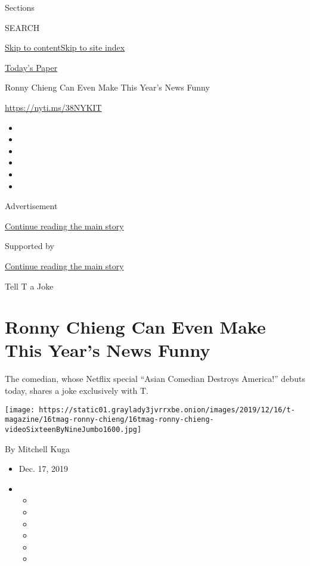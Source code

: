 Sections

SEARCH

\protect\hyperlink{site-content}{Skip to
content}\protect\hyperlink{site-index}{Skip to site index}

\href{https://myaccount.nytimes3xbfgragh.onion/auth/login?response_type=cookie\&client_id=vi}{}

\href{https://www.nytimes3xbfgragh.onion/section/todayspaper}{Today's
Paper}

Ronny Chieng Can Even Make This Year's News Funny

\url{https://nyti.ms/38NYKIT}

\begin{itemize}
\item
\item
\item
\item
\item
\item
\end{itemize}

Advertisement

\protect\hyperlink{after-top}{Continue reading the main story}

Supported by

\protect\hyperlink{after-sponsor}{Continue reading the main story}

Tell T a Joke

\hypertarget{ronny-chieng-can-even-make-this-years-news-funny}{%
\section{Ronny Chieng Can Even Make This Year's News
Funny}\label{ronny-chieng-can-even-make-this-years-news-funny}}

The comedian, whose Netflix special ``Asian Comedian Destroys America!''
debuts today, shares a joke exclusively with T.

\texttt{[image: https://static01.graylady3jvrrxbe.onion/images/2019/12/16/t-magazine/16tmag-ronny-chieng/16tmag-ronny-chieng-videoSixteenByNineJumbo1600.jpg]}

By Mitchell Kuga

\begin{itemize}
\item
  Dec. 17, 2019
\item
  \begin{itemize}
  \item
  \item
  \item
  \item
  \item
  \item
  \end{itemize}
\end{itemize}

